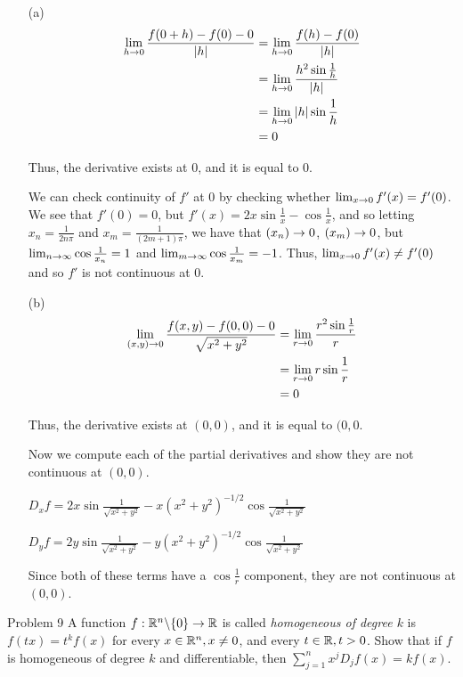 \documentclass{hmwk}
\begin{document}
\begin{solution}
\begin{itemize}
    \item[(a)] \begin{align*}
        \lim_{h \rightarrow 0 }\frac{f(0 + h) - f(0) - 0}{|h|} &= \lim_{h \rightarrow 0}\frac{f(h) - f(0)}{|h|} \\
        &= \lim_{h \rightarrow 0}\frac{h^2 \sin \frac{1}{h}}{|h|} \\
        &= \lim_{h \rightarrow 0}|h|\sin\frac{1}{h} \\
        &= 0
    \end{align*}

    \pre Thus, the derivative exists at 0, and it is equal to 0. 

    \pre We can check continuity of $f'$ at 0 by checking whether $\lim_{x \rightarrow 0}f'(x) = f'(0)$. We see that $f'(0) = 0$, but $f'(x) = 2x\sin\frac{1}{x} - \cos\frac{1}{x}$, and so letting $x_n = \frac{1}{2n\pi}$ and $x_m = \frac{1}{(2m+1)\pi}$, we have that $(x_n) \rightarrow 0$, $(x_m) \rightarrow 0$, but $\lim_{n \rightarrow \infty}\cos\frac{1}{x_n} = 1$ and $\lim_{m \rightarrow \infty}\cos\frac{1}{x_m} = -1$. Thus, $\lim_{x \rightarrow 0}f'(x) \neq f'(0)$ and so $f'$ is not continuous at 0.

    \item[(b)] \begin{align*}
        \lim_{(x, y) \rightarrow 0}\frac{f(x, y) - f(0, 0) - 0}{\sqrt{x^2 + y^2}} &= \lim_{r \rightarrow 0}\frac{r^2\sin\frac{1}{r}}{r} \\
        &= \lim_{r \rightarrow 0}r\sin\frac{1}{r} \\
        &= 0
    \end{align*}

    \pre Thus, the derivative exists at $(0, 0)$, and it is equal to $(0, 0$. 

    \pre Now we compute each of the partial derivatives and show they are not continuous at $(0, 0)$.

    \pre $D_xf = 2x\sin\frac{1}{\sqrt{x^2 + y^2}} - x(x^2 + y^2)^{-1/2}\cos\frac{1}{\sqrt{x^2 + y^2}}$

    \pre $D_yf = 2y\sin\frac{1}{\sqrt{x^2 + y^2}} - y(x^2 + y^2)^{-1/2}\cos\frac{1}{\sqrt{x^2 + y^2}}$

    \pre Since both of these terms have a $\cos\frac{1}{r}$ component, they are not continuous at $(0, 0)$.
\end{itemize}
\end{solution}


\begin{problem}{Problem 9}
A function $f: \mathbb{R}^n\backslash\{0\} \rightarrow \mathbb{R}$ is called \textit{homogeneous of degree $k$} is $f(tx) = t^kf(x)$ for every $x \in \mathbb{R}^n, x \neq 0$, and every $t \in \mathbb{R}, t > 0$. Show that if $f$ is homogeneous of degree $k$ and differentiable, then $\sum_{j = 1}^n x^jD_jf(x) = kf(x)$.
\end{problem}
\end{document}
